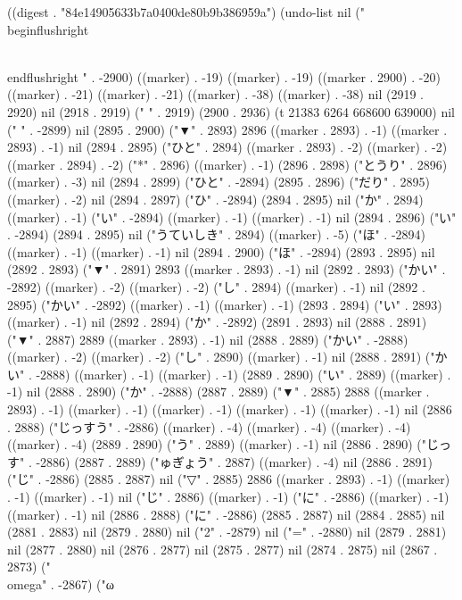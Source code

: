 
((digest . "84e14905633b7a0400de80b9b386959a") (undo-list nil ("\\begin{flushright}
 
\\end{flushright}
" . -2900) ((marker) . -19) ((marker) . -19) ((marker . 2900) . -20) ((marker) . -21) ((marker) . -21) ((marker) . -38) ((marker) . -38) nil (2919 . 2920) nil (2918 . 2919) (" " . 2919) (2900 . 2936) (t 21383 6264 668600 639000) nil (" " . -2899) nil (2895 . 2900) ("▼" . 2893) 2896 ((marker . 2893) . -1) ((marker . 2893) . -1) nil (2894 . 2895) ("ひと" . 2894) ((marker . 2893) . -2) ((marker) . -2) ((marker . 2894) . -2) ("*" . 2896) ((marker) . -1) (2896 . 2898) ("とうり" . 2896) ((marker) . -3) nil (2894 . 2899) ("ひと" . -2894) (2895 . 2896) ("だり" . 2895) ((marker) . -2) nil (2894 . 2897) ("ひ" . -2894) (2894 . 2895) nil ("か" . 2894) ((marker) . -1) ("い" . -2894) ((marker) . -1) ((marker) . -1) nil (2894 . 2896) ("い" . -2894) (2894 . 2895) nil ("うていしき" . 2894) ((marker) . -5) ("ほ" . -2894) ((marker) . -1) ((marker) . -1) nil (2894 . 2900) ("ほ" . -2894) (2893 . 2895) nil (2892 . 2893) ("▼" . 2891) 2893 ((marker . 2893) . -1) nil (2892 . 2893) ("かい" . -2892) ((marker) . -2) ((marker) . -2) ("し" . 2894) ((marker) . -1) nil (2892 . 2895) ("かい" . -2892) ((marker) . -1) ((marker) . -1) (2893 . 2894) ("い" . 2893) ((marker) . -1) nil (2892 . 2894) ("か" . -2892) (2891 . 2893) nil (2888 . 2891) ("▼" . 2887) 2889 ((marker . 2893) . -1) nil (2888 . 2889) ("かい" . -2888) ((marker) . -2) ((marker) . -2) ("し" . 2890) ((marker) . -1) nil (2888 . 2891) ("かい" . -2888) ((marker) . -1) ((marker) . -1) (2889 . 2890) ("い" . 2889) ((marker) . -1) nil (2888 . 2890) ("か" . -2888) (2887 . 2889) ("▼" . 2885) 2888 ((marker . 2893) . -1) ((marker) . -1) ((marker) . -1) ((marker) . -1) ((marker) . -1) nil (2886 . 2888) ("じっすう" . -2886) ((marker) . -4) ((marker) . -4) ((marker) . -4) ((marker) . -4) (2889 . 2890) ("う" . 2889) ((marker) . -1) nil (2886 . 2890) ("じっす" . -2886) (2887 . 2889) ("ゅぎょう" . 2887) ((marker) . -4) nil (2886 . 2891) ("じ" . -2886) (2885 . 2887) nil ("▽" . 2885) 2886 ((marker . 2893) . -1) ((marker) . -1) ((marker) . -1) nil ("じ" . 2886) ((marker) . -1) ("に" . -2886) ((marker) . -1) ((marker) . -1) nil (2886 . 2888) ("に" . -2886) (2885 . 2887) nil (2884 . 2885) nil (2881 . 2883) nil (2879 . 2880) nil ("2" . -2879) nil ("=" . -2880) nil (2879 . 2881) nil (2877 . 2880) nil (2876 . 2877) nil (2875 . 2877) nil (2874 . 2875) nil (2867 . 2873) ("\\omega" . -2867) ("ω
